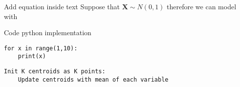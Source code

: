 \documentclass[12pt]{beamer}
\begin{document}
\begin{frame}{Add equation inside text}
Suppose that $\bm{X} \sim N(0,1)$ therefore we can model with 

\end{frame}

\begin{frame}[fragile]{Code python implementation}
\begin{lstlisting}
for x in range(1,10):
	print(x)
\end{lstlisting}
\end{frame}

\begin{frame}[fragile]
\begin{verbatim}
Init K centroids as K points:
	Update centroids with mean of each variable
\end{verbatim}
\end{frame}
\end{document}
